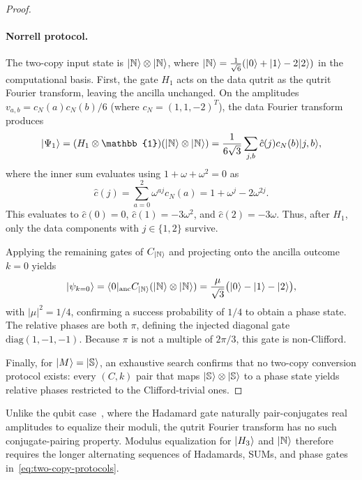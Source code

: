 \documentclass[11pt]{article}
\theoremstyle{definition}
\newcommand{\microspace}{\mspace{0.5mu}}
\newcommand{\ket}[1]{\lvert\microspace #1 \microspace \rangle}
\newcommand{\bra}[1]{\langle\microspace #1 \microspace \rvert}
\newcommand{\I}{\mathbb{1}}
\newcommand{\Strange}{\ket{\mathbb{S}}}
\newcommand{\Hth}{\ket{H_3}}
\newcommand{\Norrell}{\ket{\mathbb{N}}}
\begin{document}
\begin{proof}
		\paragraph{Norrell protocol.}
		The two-copy input state is $\Norrell \otimes \Norrell$, where $\Norrell = \frac{1}{\sqrt{6}}(\ket{0} + \ket{1} - 2\ket{2})$ in the computational basis. First, the gate $H_1$ acts on the data qutrit as the qutrit Fourier transform, leaving the ancilla unchanged. On the amplitudes $v_{a,b} = c_N(a) c_N(b)/6$ (where $c_N = (1, 1, -2)^T$), the data Fourier transform produces
		\begin{equation}
			\ket{\Psi_1} = (H_1 \otimes \I) (\Norrell \otimes \Norrell) = \frac{1}{6\sqrt{3}} \sum_{j, b} \hat{c}(j) c_N(b) \ket{j, b},
		\end{equation}
		where the inner sum evaluates using $1 + \omega + \omega^2 = 0$ as
		\begin{equation}
			\hat{c}(j) = \sum_{a=0}^2 \omega^{aj} c_N(a) = 1 + \omega^j - 2\omega^{2j}.
		\end{equation}
		This evaluates to $\hat{c}(0) = 0$, $\hat{c}(1) = -3\omega^2$, and $\hat{c}(2) = -3\omega$. Thus, after $H_1$, only the data components with $j \in \{1, 2\}$ survive.

		Applying the remaining gates of $C_{\Norrell}$ and projecting onto the ancilla outcome $k = 0$ yields
		\begin{equation}\label{eq:N-output}
			\ket{\psi_{k=0}} = \bra{0}_{\mathrm{anc}} C_{\Norrell} (\Norrell \otimes \Norrell) = \frac{\mu}{\sqrt{3}} \big(\ket{0} - \ket{1} - \ket{2}\big),
		\end{equation}
		with $|\mu|^2 = 1/4$, confirming a success probability of $1/4$ to obtain a phase state. The relative phases are both $\pi$, defining the injected diagonal gate $\mathrm{diag}(1, -1, -1)$. Because $\pi$ is not a multiple of $2\pi/3$, this gate is non-Clifford.

		Finally, for $\ket{M} = \Strange$, an exhaustive search confirms that no two-copy conversion protocol exists: every $(C, k)$ pair that maps $\Strange \otimes \Strange$ to a phase state yields relative phases restricted to the Clifford-trivial ones.
	\end{proof}

	Unlike the qubit case~\cite[Sec.~III]{bravyi2005universal}, where the Hadamard gate naturally pair-conjugates real amplitudes to equalize their moduli, the qutrit Fourier transform has no such conjugate-pairing property. Modulus equalization for $\Hth$ and $\Norrell$ therefore requires the longer alternating sequences of Hadamards, SUMs, and phase gates in~\eqref{eq:two-copy-protocols}.
\end{document}
